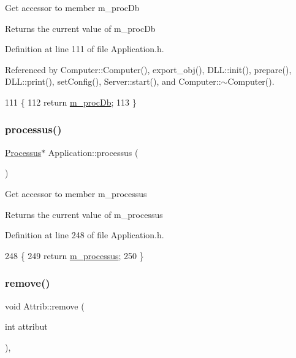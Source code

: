 Get accessor to member m\+\_\+proc\+Db \begin{DoxyReturn}{Returns}
the current value of m\+\_\+proc\+Db 
\end{DoxyReturn}


Definition at line 111 of file Application.\+h.



Referenced by Computer\+::\+Computer(), export\+\_\+obj(), D\+L\+L\+::init(), prepare(), D\+L\+L\+::print(), set\+Config(), Server\+::start(), and Computer\+::$\sim$\+Computer().


\begin{DoxyCode}
111                           \{
112     \textcolor{keywordflow}{return} \hyperlink{classApplication_af030cefeb69586f01e965606d5dd8919}{m\_procDb};
113   \}
\end{DoxyCode}
\mbox{\label{classApplication_a8d0918e800a5de01795bc2669d74ed82}} 
\subsubsection{\texorpdfstring{processus()}{processus()}}
{\footnotesize\ttfamily \hyperlink{classProcessus}{Processus}$\ast$ Application\+::processus (\begin{DoxyParamCaption}{ }\end{DoxyParamCaption})\hspace{0.3cm}{\ttfamily [inline]}}

Get accessor to member m\+\_\+processus \begin{DoxyReturn}{Returns}
the current value of m\+\_\+processus 
\end{DoxyReturn}


Definition at line 248 of file Application.\+h.


\begin{DoxyCode}
248                           \{
249     \textcolor{keywordflow}{return} \hyperlink{classApplication_ab5eb4b3d3bef5ab9fce9c69401ce5786}{m\_processus};
250   \}
\end{DoxyCode}
\mbox{\label{classAttrib_a7d4ef7e32d93cb287792b87b857e79f3}} 
\subsubsection{\texorpdfstring{remove()}{remove()}}
{\footnotesize\ttfamily void Attrib\+::remove (\begin{DoxyParamCaption}\item[{int}]{attribut }\end{DoxyParamCaption})\hspace{0.3cm}{\ttfamily [inline]}, {\ttfamily [inherited]}}


